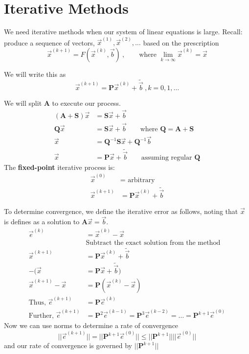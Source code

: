 \documentclass[12pt]{article}
\newcommand{\ve}[1]{\ensuremath{\mathbf{#1}}}
\begin{document}
\section{Iterative Methods}
We need iterative methods when our system of linear equations is large. Recall: produce a sequence of vectors, $\vec{x}^{(1)}, \vec{x}^{(2)}, \dots$ based on the prescription
  \[\vec{x}^{(k+1)} = F(\vec{x}^{(k)}, \vec{b})\:, \qquad \text{where } \displaystyle \lim_{k \rightarrow \infty} \vec{x}^{(k)} = \vec{x}\] 

We will write this as \[\vec{x}^{(k+1)} = \ve{P}\vec{x}^{(k)} +  \tilde{\vec{b}}\:, k = 0, 1, \dots \]

We will split $\ve{A}$ to execute our process.
%
\begin{align}
(\ve{A} + \ve{S}) \vec{x} &= \ve{S}\vec{x} + \vec{b} \nonumber \\
%
\ve{Q} \vec{x} &= \ve{S}\vec{x} + \vec{b} 
\qquad\text{where } \ve{Q} = \ve{A} + \ve{S} \nonumber \\
%
\vec{x} &= \ve{Q}^{-1} \ve{S}\vec{x} + \ve{Q}^{-1} \vec{b} 
\nonumber \\
%
\vec{x} &= \ve{P}\vec{x} + \tilde{\vec{b}}  
\qquad\text{assuming regular } \ve{Q}\nonumber
\end{align}
%
The \textbf{fixed-point} iterative process is:
\begin{align}
\vec{x}^{(0)} &= \text{ arbitrary}\nonumber \\
\vec{x}^{(k+1)} &= \ve{P}\vec{x}^{(k)} + \tilde{\vec{b}} \nonumber
\end{align}

To determine convergence, we define the iterative error as follows, noting that $\vec{x}$ is defines as a solution to $\ve{A}\vec{x} = \vec{b}$. 
%
\begin{align}
\vec{e}^{(k)} &= \vec{x}^{(k)} - \vec{x} \nonumber \\
%
&\text{Subtract the exact solution from the method} \nonumber \\
%
\vec{x}^{(k+1)} &= \ve{P}\vec{x}^{(k)} + \tilde{\vec{b}} \nonumber \\
- (\vec{x} &= \ve{P}\vec{x} + \tilde{\vec{b}}) \nonumber \\
%
\vec{x}^{(k+1)} - \vec{x} &= \ve{P}(\vec{x}^{(k)} - \vec{x})\nonumber \\
%
\text{Thus, } \vec{e}^{(k+1)} &= \ve{P}\vec{e}^{(k)} \nonumber \\
%
\text{Further, } \vec{e}^{(k+1)} &= \ve{P}^2\vec{e}^{(k-1)} = \ve{P}^3\vec{e}^{(k-2)} = \dots = \ve{P}^{k+1}\vec{e}^{(0)}\nonumber
%
\end{align}
%
Now we can use norms  to determine a rate of convergence
\[||\vec{e}^{(k+1)}|| = ||\ve{P}^{k+1}\vec{e}^{(0)}|| \leq ||\ve{P}^{k+1}|| ||\vec{e}^{(0)}|| \]
and our rate of convergence is governed by $||\ve{P}^{k+1}||$
\end{document}
